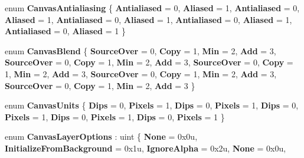 \begin{DoxyCompactItemize}
enum {\bfseries Canvas\+Antialiasing} \{ \newline
{\bfseries Antialiased} = 0, 
{\bfseries Aliased} = 1, 
{\bfseries Antialiased} = 0, 
{\bfseries Aliased} = 1, 
\newline
{\bfseries Antialiased} = 0, 
{\bfseries Aliased} = 1, 
{\bfseries Antialiased} = 0, 
{\bfseries Aliased} = 1, 
\newline
{\bfseries Antialiased} = 0, 
{\bfseries Aliased} = 1
 \}
\item 
\mbox{\label{namespace_microsoft_1_1_graphics_1_1_canvas_a4d6f8dfcb051c810dfc379d736e689a4}} 
enum {\bfseries Canvas\+Blend} \{ \newline
{\bfseries Source\+Over} = 0, 
{\bfseries Copy} = 1, 
{\bfseries Min} = 2, 
{\bfseries Add} = 3, 
\newline
{\bfseries Source\+Over} = 0, 
{\bfseries Copy} = 1, 
{\bfseries Min} = 2, 
{\bfseries Add} = 3, 
\newline
{\bfseries Source\+Over} = 0, 
{\bfseries Copy} = 1, 
{\bfseries Min} = 2, 
{\bfseries Add} = 3, 
\newline
{\bfseries Source\+Over} = 0, 
{\bfseries Copy} = 1, 
{\bfseries Min} = 2, 
{\bfseries Add} = 3, 
\newline
{\bfseries Source\+Over} = 0, 
{\bfseries Copy} = 1, 
{\bfseries Min} = 2, 
{\bfseries Add} = 3
 \}
\item 
\mbox{\label{namespace_microsoft_1_1_graphics_1_1_canvas_a42a64ab003f060d5bc514b2c0c2f9869}} 
enum {\bfseries Canvas\+Units} \{ \newline
{\bfseries Dips} = 0, 
{\bfseries Pixels} = 1, 
{\bfseries Dips} = 0, 
{\bfseries Pixels} = 1, 
\newline
{\bfseries Dips} = 0, 
{\bfseries Pixels} = 1, 
{\bfseries Dips} = 0, 
{\bfseries Pixels} = 1, 
\newline
{\bfseries Dips} = 0, 
{\bfseries Pixels} = 1
 \}
\item 
\mbox{\label{namespace_microsoft_1_1_graphics_1_1_canvas_a111054cba4b53759d62af260e252fe48}} 
enum {\bfseries Canvas\+Layer\+Options} \+: uint \{ \newline
{\bfseries None} = 0x0u, 
{\bfseries Initialize\+From\+Background} = 0x1u, 
{\bfseries Ignore\+Alpha} = 0x2u, 
{\bfseries None} = 0x0u, 
\newline

\end{DoxyCompactItemize}

